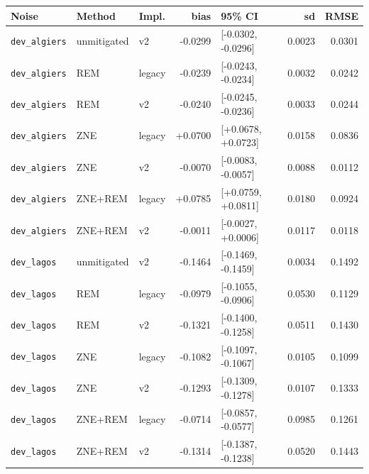 \begin{tabular}{@{}lllrlrr@{}}
\toprule
Noise & Method & Impl. & bias & 95\% CI & sd & RMSE\\
\midrule
\texttt{dev\_algiers} & unmitigated & v2 & -0.0299 & [-0.0302, -0.0296] & 0.0023 & 0.0301\\
\texttt{dev\_algiers} & REM & legacy & -0.0239 & [-0.0243, -0.0234] & 0.0032 & 0.0242\\
\texttt{dev\_algiers} & REM & v2 & -0.0240 & [-0.0245, -0.0236] & 0.0033 & 0.0244\\
\texttt{dev\_algiers} & ZNE & legacy & +0.0700 & [+0.0678, +0.0723] & 0.0158 & 0.0836\\
\texttt{dev\_algiers} & ZNE & v2 & -0.0070 & [-0.0083, -0.0057] & 0.0088 & 0.0112\\
\texttt{dev\_algiers} & ZNE+REM & legacy & +0.0785 & [+0.0759, +0.0811] & 0.0180 & 0.0924\\
\texttt{dev\_algiers} & ZNE+REM & v2 & -0.0011 & [-0.0027, +0.0006] & 0.0117 & 0.0118\\
\texttt{dev\_lagos} & unmitigated & v2 & -0.1464 & [-0.1469, -0.1459] & 0.0034 & 0.1492\\
\texttt{dev\_lagos} & REM & legacy & -0.0979 & [-0.1055, -0.0906] & 0.0530 & 0.1129\\
\texttt{dev\_lagos} & REM & v2 & -0.1321 & [-0.1400, -0.1258] & 0.0511 & 0.1430\\
\texttt{dev\_lagos} & ZNE & legacy & -0.1082 & [-0.1097, -0.1067] & 0.0105 & 0.1099\\
\texttt{dev\_lagos} & ZNE & v2 & -0.1293 & [-0.1309, -0.1278] & 0.0107 & 0.1333\\
\texttt{dev\_lagos} & ZNE+REM & legacy & -0.0714 & [-0.0857, -0.0577] & 0.0985 & 0.1261\\
\texttt{dev\_lagos} & ZNE+REM & v2 & -0.1314 & [-0.1387, -0.1238] & 0.0520 & 0.1443\\
\bottomrule
\end{tabular}

